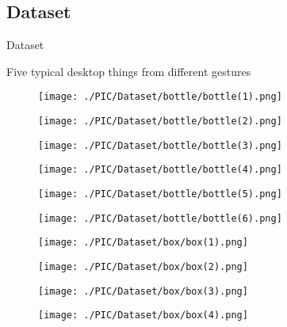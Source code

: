 \documentclass[xcolor=table,compress,blue]{beamer}
\begin{document}
\subsection{Dataset}
\begin{frame}{Dataset}
	\begin{exampleblock}{Five typical desktop things from different gestures}
		\begin{figure}[htpb]
			\centering
			\begin{minipage}[b]{0.65in}
				\centerline{ \texttt{[image: ./PIC/Dataset/bottle/bottle(1).png]} }
			\end{minipage}
			\begin{minipage}[b]{0.65in}
				\centerline{ \texttt{[image: ./PIC/Dataset/bottle/bottle(2).png]} }
			\end{minipage}
			\begin{minipage}[b]{0.65in}
				\centerline{ \texttt{[image: ./PIC/Dataset/bottle/bottle(3).png]} }
			\end{minipage}
			\begin{minipage}[b]{0.65in}
				\centerline{ \texttt{[image: ./PIC/Dataset/bottle/bottle(4).png]} }
			\end{minipage}
			\begin{minipage}[b]{0.65in}
				\centerline{ \texttt{[image: ./PIC/Dataset/bottle/bottle(5).png]} }
			\end{minipage}
			\begin{minipage}[b]{0.65in}
				\centerline{ \texttt{[image: ./PIC/Dataset/bottle/bottle(6).png]} }
			\end{minipage}
			\begin{minipage}[b]{0.65in}
				\centerline{ \texttt{[image: ./PIC/Dataset/box/box(1).png]} }
			\end{minipage}
			\begin{minipage}[b]{0.65in}
				\centerline{ \texttt{[image: ./PIC/Dataset/box/box(2).png]} }
			\end{minipage}
			\begin{minipage}[b]{0.65in}
				\centerline{ \texttt{[image: ./PIC/Dataset/box/box(3).png]} }
			\end{minipage}
			\begin{minipage}[b]{0.65in}
				\centerline{ \texttt{[image: ./PIC/Dataset/box/box(4).png]} }

\end{minipage}
\end{figure}
\end{exampleblock}
\end{frame}
\end{document}
